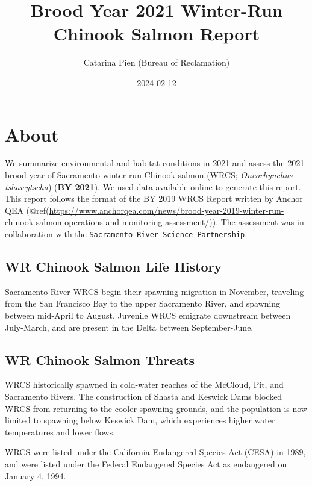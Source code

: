 \documentclass[
]{book}
\title{Brood Year 2021 Winter-Run Chinook Salmon Report}
\author{Catarina Pien (Bureau of Reclamation)}
\date{2024-02-12}
\theoremstyle{definition}
\theoremstyle{definition}
\theoremstyle{definition}
\theoremstyle{definition}
\theoremstyle{remark}
\begin{document}
\maketitle

{
\setcounter{tocdepth}{1}
\tableofcontents
}
\hypertarget{about}{%
\chapter{About}\label{about}}

We summarize environmental and habitat conditions in 2021 and assess the 2021 brood year of Sacramento winter-run Chinook salmon (WRCS; \emph{Oncorhynchus tshawytscha}) (\textbf{BY 2021}). We used data available online to generate this report. This report follows the format of the BY 2019 WRCS Report written by Anchor QEA (@ref(\url{https://www.anchorqea.com/news/brood-year-2019-winter-run-chinook-salmon-operations-and-monitoring-assessment/})). The assessment was in collaboration with the \texttt{Sacramento\ River\ Science\ Partnership}.

\hypertarget{wr-chinook-salmon-life-history}{%
\section{WR Chinook Salmon Life History}\label{wr-chinook-salmon-life-history}}

Sacramento River WRCS begin their spawning migration in November, traveling from the San Francisco Bay to the upper Sacramento River, and spawning between mid-April to August. Juvenile WRCS emigrate downstream between July-March, and are present in the Delta between September-June.

\hypertarget{wr-chinook-salmon-threats}{%
\section{WR Chinook Salmon Threats}\label{wr-chinook-salmon-threats}}

WRCS historically spawned in cold-water reaches of the McCloud, Pit, and Sacramento Rivers. The construction of Shasta and Keswick Dams blocked WRCS from returning to the cooler spawning grounds, and the population is now limited to spawning below Keswick Dam, which experiences higher water temperatures and lower flows.

WRCS were listed under the California Endangered Species Act (CESA) in 1989, and were listed under the Federal Endangered Species Act as endangered on January 4, 1994.
\end{document}
